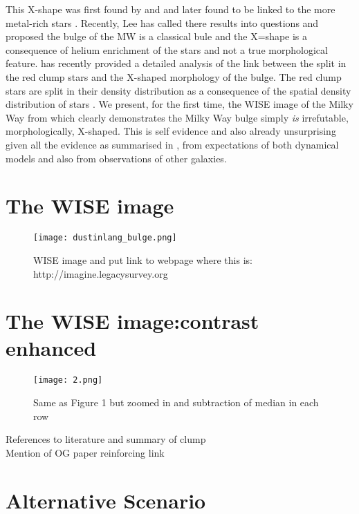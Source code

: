 \documentclass[12pt, preprint]{aastex}
\begin{document}
This X-shape was first found by \citet{McWillian} and \citet{Nataf} and later found to be linked to the more metal-rich stars \citep{Nes2012, Uttenthaler2012, RJ2014}. Recently, Lee has called there results into questions and proposed the bulge of the MW is a classical bule and the X=shape is a consequence of helium enrichment of the stars and not a true morphological feature. \citet{Gonzalez2015} has recently provided a detailed analysis of the link between the split in the red clump stars and the X-shaped morphology of the bulge.  The red clump stars are split in their density distribution as a consequence of the spatial density distribution of stars \citep{McWillian, Nataf, Ness, Saito}. We present, for the first time, the WISE image of the Milky Way from \citet{Lang2014a} which clearly demonstrates the Milky Way bulge simply \textit{is} irrefutable, morphologically, X-shaped. This is self evidence and also already unsurprising given all the evidence as summarised in \citet{Gonzalez2015}, from expectations of both dynamical models and also from observations of other galaxies. 


\section{The WISE image}

\begin{figure}[h!]
\centering
        \texttt{[image: dustinlang\_bulge.png]}
\caption{WISE image and put link to webpage where this is: http://imagine.legacysurvey.org}
\label{fig:xbulge}
\end{figure}

\section{The WISE image:contrast enhanced}

\begin{figure}[h!]
\centering
        \texttt{[image: 2.png]}
\caption{Same as Figure 1 but zoomed in and subtraction of median in each row }
\label{fig:filt}
\end{figure}



References to literature and summary of clump \\
Mention of OG paper reinforcing link \\

\section{Alternative Scenario} 
\end{document}
